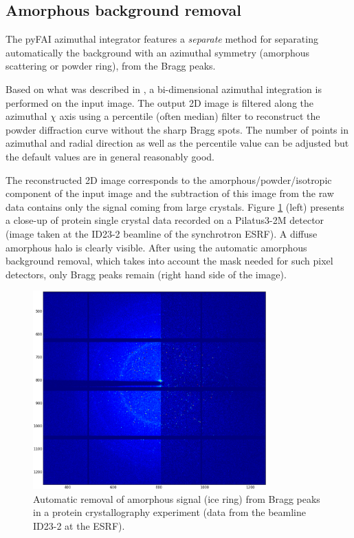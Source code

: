 \documentclass{iucr}
\begin{document}
\subsection{Amorphous background removal}

The pyFAI azimuthal integrator features a \textit{separate} method for
separating automatically the background with an azimuthal symmetry (amorphous
scattering or powder ring), from the Bragg peaks.

Based on what was described in \cite{PyFAI_PDJ}, a bi-dimensional azimuthal
integration is performed on the input image.
The output 2D image is filtered along the azimuthal $\chi$ axis using a
percentile (often median) filter to reconstruct the powder diffraction curve
without the sharp Bragg spots.
The number of points in azimuthal and radial direction as well as
the percentile value can be adjusted but the default values are in
general reasonably good.

The reconstructed 2D image corresponds to the amorphous/powder/isotropic
component of the input image and the subtraction of this image from
the raw data contains only the signal coming from large crystals.
Figure \ref{separate} (left)
presents a close-up of protein single crystal data recorded on a Pilatus3-2M
detector (image taken at the ID23-2 beamline of the synchrotron ESRF).
A diffuse amorphous halo is clearly visible.
After using the automatic amorphous background removal, which takes into account
the mask needed for such pixel detectors, only Bragg peaks remain (right hand
side of the image).

\begin{figure}
\label{separate}
\begin{center}
\includegraphics[width=9cm]{separate_id23.eps}
\caption{Automatic removal of amorphous signal (ice ring) from Bragg peaks in a
protein crystallography experiment (data from the beamline ID23-2 at
the ESRF).}
\end{center}
\end{figure}
\end{document}
